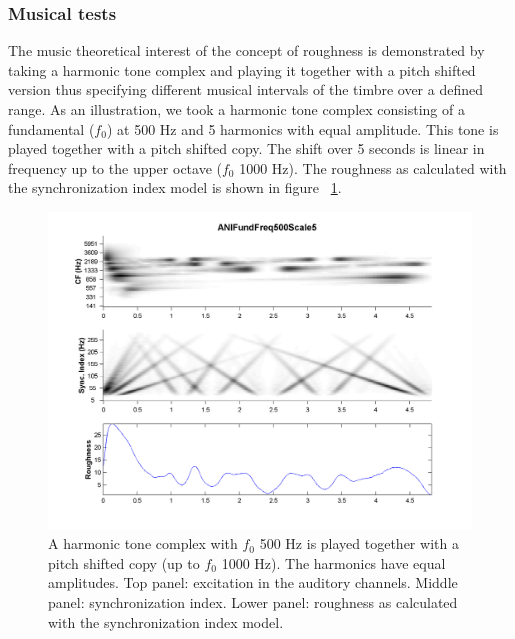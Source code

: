 \subsubsection*{Musical tests}
The music theoretical interest of the concept of roughness is
demonstrated by taking a harmonic tone complex and playing it
together with a pitch shifted version thus specifying different
musical intervals of the timbre over a defined range. As an
illustration, we took a harmonic tone complex consisting of a
fundamental ($f_0$) at 500 Hz and 5 harmonics with equal
amplitude. This tone is played together with a pitch shifted copy.
The shift over 5 seconds is linear in frequency up to the upper
octave ($f_0$ 1000 Hz). The roughness as calculated with the
synchronization index model is shown in figure
~\ref{Fig:RoughnessExperiments31}.
\begin{figure}[p]
  \centering
  \includegraphics[width=\IPEMDefaultFigureWidth]{Graphics/RoughnessExperiments31}
  \caption{A harmonic tone complex with $f_0$ 500 Hz is played together with a
  pitch shifted copy (up to $f_0$ 1000 Hz). The harmonics have equal amplitudes.
  Top panel: excitation in the auditory channels.  Middle panel: synchronization
  index.
  Lower panel: roughness as calculated with the synchronization index model.}
  \label{Fig:RoughnessExperiments31}
\end{figure}

